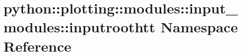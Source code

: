 \hypertarget{namespacepython_1_1plotting_1_1modules_1_1input__modules_1_1inputroothtt}{
\section{python::plotting::modules::input\_\-modules::inputroothtt Namespace Reference}
\label{namespacepython_1_1plotting_1_1modules_1_1input__modules_1_1inputroothtt}
}
